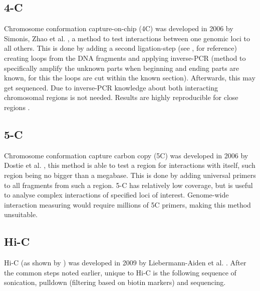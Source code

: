 \subsection{4-C}\label{sec:4C}

Chromosome conformation capture-on-chip (4C) was developed in 2006 by Simonis,
Zhao et al. \cite{simonis2006nuclear} \cite{zhao2006circular}, a method to test
interactions between one genomic loci to all others. This is done by adding a
second ligation-step (see ,  for
reference) creating loops from the DNA fragments and applying inverse-PCR
(method to specifically amplify the unknown parts when beginning and ending
parts are known, for this the loops are cut within the known section).
Afterwards, this may get sequenced. Due to inverse-PCR knowledge about both
interacting chromosomal regions is not needed.  Results are highly reproducible
for close regions .




\subsection{5-C}\label{sec:5C}

Chromosome conformation capture carbon copy (5C) was developed in 2006 by
Dostie et al. \cite{dostie2006chromosome}, this method is able to test a region
for interactions with itself, such region being no bigger than a megabase. This
is done by adding universal primers to all fragments from such a region.
5-C has relatively low coverage, but is useful to analyse complex interactions
of specified loci of interest. Genome-wide interaction measuring would require
millions of 5C primers, making this method unsuitable.







\subsection{Hi-C}\label{sec:HiC}

Hi-C (as shown by ) was developed in 2009 by Liebermann-Aiden et al.
\cite{lieberman2009comprehensive}. After the common steps noted earlier, unique
to Hi-C is the following sequence of sonication, pulldown (filtering based on
biotin markers) and sequencing.


